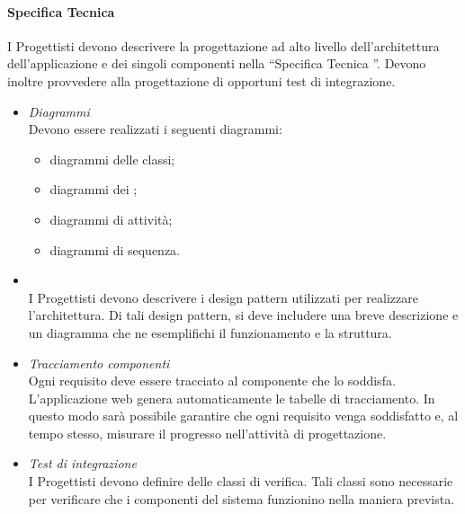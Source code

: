 \paragraph{Specifica Tecnica}
I Progettisti devono descrivere la progettazione ad alto livello dell’architettura dell’applicazione e dei singoli componenti nella “Specifica Tecnica \VersioneST ”. Devono inoltre
provvedere alla progettazione di opportuni test di integrazione.
\begin{itemize}
\item \emph{Diagrammi } \\
Devono essere realizzati i seguenti diagrammi:
\begin{itemize}
\item diagrammi delle classi;
\item diagrammi dei ;
\item diagrammi di attività;
\item diagrammi di sequenza.
\end{itemize}

\item \emph{}\\
I Progettisti devono descrivere i design pattern utilizzati per realizzare l’architettura.
Di tali design pattern, si deve includere una breve descrizione e un diagramma
che ne esemplifichi il funzionamento e la struttura.
\item \emph{Tracciamento componenti}\\
Ogni requisito deve essere tracciato al componente che lo soddisfa. L’applicazione
web  genera automaticamente le tabelle di tracciamento.
In questo modo sarà possibile garantire che ogni requisito venga soddisfatto e,
al tempo stesso, misurare il progresso nell’attività di progettazione.
\item \emph{Test di integrazione}\\
I Progettisti devono definire delle classi di verifica. Tali classi sono necessarie
per verificare che i componenti del sistema funzionino nella maniera prevista.

\end{itemize}


